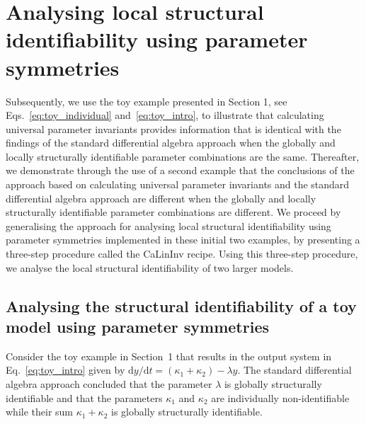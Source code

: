 \documentclass[12pt]{article}
\begin{document}
\section{Analysing local structural identifiability using parameter symmetries}


Subsequently, we use the toy example presented in Section 1, see Eqs.~\eqref{eq:toy_individual} and~\eqref{eq:toy_intro}, to illustrate that calculating universal parameter invariants provides information that is identical with the findings of the standard differential algebra approach when the globally and locally structurally identifiable parameter combinations are the same. Thereafter, we demonstrate through the use of a second example that the conclusions of the approach based on calculating universal parameter invariants and the standard differential algebra approach are different when the globally and locally structurally identifiable parameter combinations are different. We proceed by generalising the approach for analysing local structural identifiability using parameter symmetries implemented in these initial two examples, by presenting a three-step procedure called the CaLinInv recipe. Using this three-step procedure, we analyse the local structural identifiability of two larger models. 


\subsection{Analysing the structural identifiability of a toy model using parameter symmetries}

Consider the toy example in Section~1 that results in the output system in Eq.~\eqref{eq:toy_intro} given by $\mathrm{d}y/\mathrm{d}t=(\kappa_{1}+\kappa_{2})-\lambda{y}$. The standard differential algebra approach concluded that the parameter $\lambda$ is globally structurally identifiable and that the parameters $\kappa_{1}$ and $\kappa_{2}$ are individually non-identifiable while their sum $\kappa_{1}+\kappa_{2}$ is globally structurally identifiable.
\end{document}

